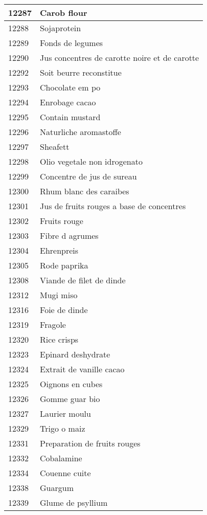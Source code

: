 \begin{longtable}{|l|l|}
12287 & Carob flour \\ \hline 
12288 & Sojaprotein \\ \hline 
12289 & Fonds de legumes \\ \hline 
12290 & Jus concentres de carotte noire et de carotte \\ \hline 
12292 & Soit beurre reconstitue \\ \hline 
12293 & Chocolate em po \\ \hline 
12294 & Enrobage cacao \\ \hline 
12295 & Contain mustard \\ \hline 
12296 & Naturliche aromastoffe \\ \hline 
12297 & Sheafett \\ \hline 
12298 & Olio vegetale non idrogenato \\ \hline 
12299 & Concentre de jus de sureau \\ \hline 
12300 & Rhum blanc des caraibes \\ \hline 
12301 & Jus de fruits rouges a base de concentres \\ \hline 
12302 & Fruits rouge \\ \hline 
12303 & Fibre d agrumes \\ \hline 
12304 & Ehrenpreis \\ \hline 
12305 & Rode paprika \\ \hline 
12308 & Viande de filet de dinde \\ \hline 
12312 & Mugi miso \\ \hline 
12316 & Foie de dinde \\ \hline 
12319 & Fragole \\ \hline 
12320 & Rice crisps \\ \hline 
12323 & Epinard deshydrate \\ \hline 
12324 & Extrait de vanille cacao \\ \hline 
12325 & Oignons en cubes \\ \hline 
12326 & Gomme guar bio \\ \hline 
12327 & Laurier moulu \\ \hline 
12329 & Trigo o maiz \\ \hline 
12331 & Preparation de fruits rouges \\ \hline 
12332 & Cobalamine \\ \hline 
12334 & Couenne cuite \\ \hline 
12338 & Guargum \\ \hline 
12339 & Glume de psyllium \\ \hline 

\end{longtable}
